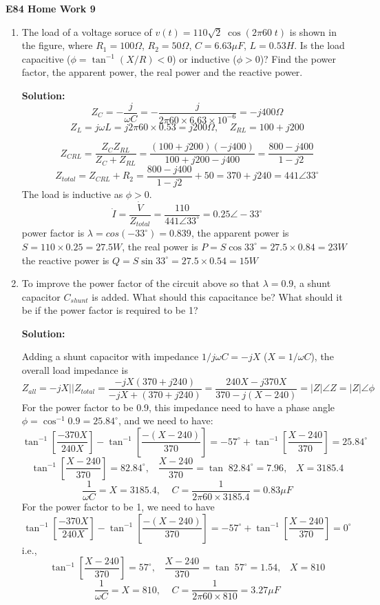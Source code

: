 \usepackage{html}

\begin{center}
{\Large \bf E84 Home Work 9}
\end{center}
\begin{enumerate}

\item The load of a voltage soruce of $v(t)=110\sqrt{2} \;\cos(2\pi 60\;t)$
is shown in the figure, where $R_1=100\Omega$, $R_2=50\Omega$, $C=6.63\mu F$, 
$L=0.53 H$. Is the load capacitive ($\phi=\tan^{-1}(X/R)<0$) or inductive 
($\phi>0$)? Find the power factor, the apparent power, the real power and 
the reactive power. 


  {\bf Solution:}
 \[ Z_C=-\frac{j}{\omega C}=-\frac{j}{2\pi 60\times 6.63\times 10^{-6}}
  	=-j400\Omega\]
  \[Z_L=j\omega L=j 2\pi 60\times 0.53=j200\Omega,\;\;\;\; Z_{RL}=100+j200\]
  
  \[ Z_{CRL}=\frac{Z_C Z_{RL}}{Z_C+Z_{RL}}=\frac{(100+j200)(-j400)}{100+j200-j400}
  	=\frac{800-j400}{1-j2}	\]
  \[
  Z_{total}=Z_{CRL}+R_2=\frac{800-j400}{1-j2}+50=370+j240=441\angle 33^\circ
  \]
  The load is inductive as $\phi>0$.
  \[ \dot{I}=\frac{\dot{V}}{Z_{total}}=\frac{110}{441\angle 33^\circ}
  	=0.25\angle -33^\circ	\]
  power factor is $\lambda=cos (-33^\circ)=0.839$, 
  the apparent power is $S=110\times 0.25=27.5 W$, 
  the real power is $P=S \cos 33^\circ=27.5\times 0.84=23 W$
  the reactive power is $Q=S \sin 33^\circ=27.5\times 0.54=15 W$

\item To improve the power factor of the circuit above so that $\lambda=0.9$, 
  a shunt capacitor $C_{shunt}$ is added. What should this capacitance be? What
  should it be if the power factor is required to be 1?


  {\bf Solution:}
 
  Adding a shunt capacitor with impedance $1/j\omega C=-jX$ ($X=1/\omega C$), 
  the overall load impedance is
  \[	Z_{all}=-jX || Z_{total}=\frac{-jX(370+j240)}{-jX+(370+j240)}
  	=\frac{240X-j370X}{370-j(X-240)}=|Z|\angle Z=|Z|\angle \phi	\]
  For the power factor to be 0.9, this impedance need to have a phase angle 
  $\phi=\cos^{-1} 0.9=25.84^\circ$, and we need to have:
  \[	\tan^{-1}[\frac{-370X}{240X}]-\tan^{-1}[\frac{-(X-240)}{370}]=
  	-57^\circ+\tan^{-1}[\frac{X-240}{370}]=25.84^\circ \]
  \[	\tan^{-1}[\frac{X-240}{370}]=82.84^\circ, \;\;\;
  \frac{X-240}{370}=\tan \;82.84^\circ=7.96, \;\;\; X=3185.4 \]
  \[ \frac{1}{\omega C}=X=3185.4,\;\;\;\;C=\frac{1}{2\pi 60\times 3185.4}
  =0.83 \mu F \]
  For the power factor to be 1, we need to have
  \[	\tan^{-1}[\frac{-370X}{240X}]-\tan^{-1}[\frac{-(X-240)}{370}]=
  	-57^\circ+\tan^{-1}[\frac{X-240}{370}]=0^\circ \]
  i.e., 
  \[	\tan^{-1}[\frac{X-240}{370}]=57^\circ, \;\;\;
  \frac{X-240}{370}=\tan \;57^\circ=1.54, \;\;\; X=810 \]
  \[ \frac{1}{\omega C}=X=810,\;\;\;\;C=\frac{1}{2\pi 60\times 810}
  =3.27 \mu F \]


\end{enumerate}
